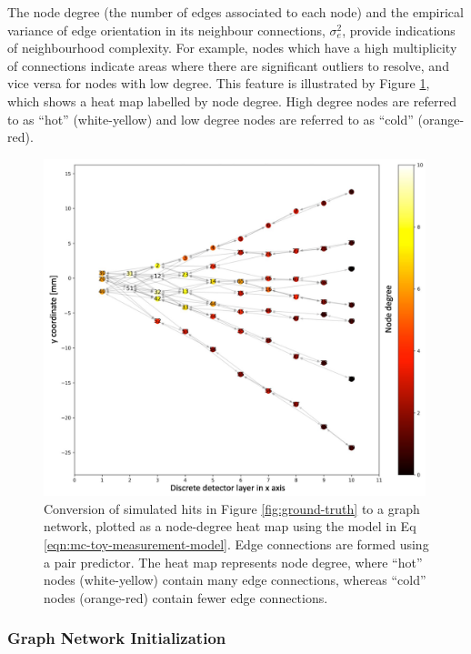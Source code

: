 The node degree (the number of edges associated to each node) and the empirical variance of edge orientation in its neighbour connections, $\sigma_{e}^{2}$, provide indications of neighbourhood complexity. For example, nodes which have a high multiplicity of connections indicate areas where there are significant outliers to resolve, and vice versa for nodes with low degree. This feature is illustrated by Figure \ref{fig:heat-map}, which shows a heat map labelled by node degree. High degree nodes are referred to as ``hot'' (white-yellow) and low degree nodes are referred to as ``cold'' (orange-red).


\begin{figure}[H]
    \centering
    \includegraphics[width=0.99\textwidth]{images/5-gnn-algorithm/heatmap-network.png}
    \caption{Conversion of simulated hits in Figure \ref{fig:ground-truth} to a graph network, plotted as a node-degree heat map using the model in Eq \eqref{eqn:mc-toy-measurement-model}. Edge connections are formed using a pair predictor. The heat map represents node degree, where ``hot'' nodes (white-yellow) contain many edge connections, whereas ``cold'' nodes (orange-red) contain fewer edge connections.}
    \label{fig:heat-map}%
\end{figure}


\subsubsection{Graph Network Initialization}

